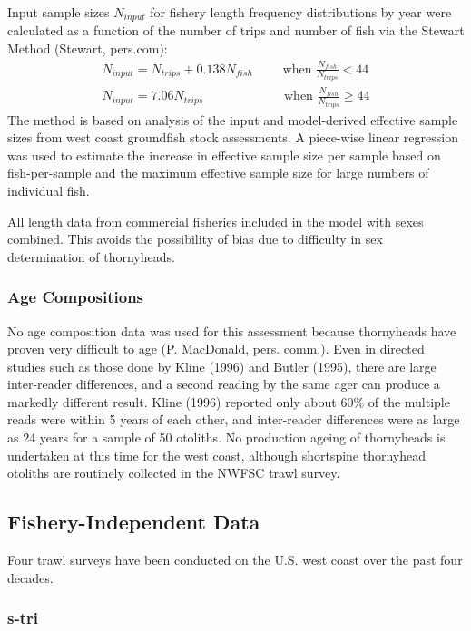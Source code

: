 \documentclass[11pt,
  english,
  letterpaper,
]{article}
\begin{document}
Input sample sizes \({N_{input}}\) for fishery length frequency distributions by year were calculated as a function of the number of trips and number of fish via the Stewart Method (Stewart, pers.com): \begin{align*}{N_{input} = N_{trips} + 0.138N_{fish}}\qquad\text{ when }\frac{N_{fish}}{N_{trips}}<44 \\
{N_{input} = 7.06N_{trips}}\qquad\qquad\qquad\text{ when }\frac{N_{fish}}{N_{trips}}\ge 44 \end{align*} The method is based on analysis of the input and model-derived effective sample sizes from west coast groundfish stock assessments. A piece-wise linear regression was used to estimate the increase in effective sample size per sample based on fish-per-sample and the maximum effective sample size for large numbers of individual fish.

All length data from commercial fisheries included in the model with sexes combined. This avoids the possibility of bias due to difficulty in sex determination of thornyheads.

\hypertarget{age-compositions}{%
\subsubsection{Age Compositions}\label{age-compositions}}

No age composition data was used for this assessment because thornyheads have proven very difficult to age (P. MacDonald, pers. comm.). Even in directed studies such as those done by Kline (1996) and Butler (1995), there are large inter-reader differences, and a second reading by the same ager can produce a markedly different result. Kline (1996) reported only about 60\% of the multiple reads were within 5 years of each other, and inter-reader differences were as large as 24 years for a sample of 50 otoliths. No production ageing of thornyheads is undertaken at this time for the west coast, although shortspine thornyhead otoliths are routinely collected in the NWFSC trawl survey.

\hypertarget{fishery-independent-data}{%
\subsection{Fishery-Independent Data}\label{fishery-independent-data}}

Four trawl surveys have been conducted on the U.S. west coast over the past four decades.

\hypertarget{section}{%
\subsubsection{\texorpdfstring{\acrlong{s-tri}}{}}\label{section}}
\end{document}
